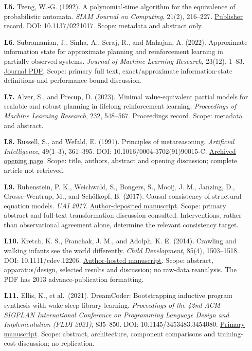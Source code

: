 \documentclass[
  11pt,
  a4paper,
]{article}
\begin{document}
\textbf{L5.} Tzeng, W.-G. (1992). A polynomial-time algorithm for the
equivalence of probabilistic automata. \emph{SIAM Journal on Computing},
21(2), 216--227.
\href{https://epubs.siam.org/doi/10.1137/0221017}{Publisher record}.
DOI: 10.1137/0221017. Scope: metadata and abstract only.

\textbf{L6.} Subramanian, J., Sinha, A., Seraj, R., and Mahajan, A.
(2022). Approximate information state for approximate planning and
reinforcement learning in partially observed systems. \emph{Journal of
Machine Learning Research}, 23(12), 1--83.
\href{https://www.jmlr.org/papers/volume23/20-1165/20-1165.pdf}{Journal
PDF}. Scope: primary full text, exact/approximate information-state
definitions and performance-bound discussion.

\textbf{L7.} Alver, S., and Precup, D. (2023). Minimal value-equivalent
partial models for scalable and robust planning in lifelong
reinforcement learning. \emph{Proceedings of Machine Learning Research},
232, 548--567.
\href{https://proceedings.mlr.press/v232/alver23a.html}{Proceedings
record}. Scope: metadata and abstract.

\textbf{L8.} Russell, S., and Wefald, E. (1991). Principles of
metareasoning. \emph{Artificial Intelligence}, 49(1--3), 361--395. DOI:
10.1016/0004-3702(91)90015-C.
\href{https://iiif.library.cmu.edu/file/Newell_box00014_fld01011_doc0001/Newell_box00014_fld01011_doc0001.pdf}{Archived
opening page}. Scope: title, authors, abstract and opening discussion;
complete article not retrieved.

\textbf{L9.} Rubenstein, P. K., Weichwald, S., Bongers, S., Mooij, J.
M., Janzing, D., Grosse-Wentrup, M., and Schölkopf, B. (2017). Causal
consistency of structural equation models. \emph{UAI 2017}.
\href{https://arxiv.org/abs/1707.00819}{Author-deposited manuscript}.
Scope: primary abstract and full-text transformation discussion
consulted. Interventions, rather than observational agreement alone,
determine the relevant consistency target.

\textbf{L10.} Kretch, K. S., Franchak, J. M., and Adolph, K. E. (2014).
Crawling and walking infants see the world differently. \emph{Child
Development}, 85(4), 1503--1518. DOI: 10.1111/cdev.12206.
\href{https://johnfranchak.github.io/padlab/publications/2014-KretchFranchakAdolph-ChiDev.pdf}{Author-hosted
manuscript}. Scope: abstract, apparatus/design, selected results and
discussion; no raw-data reanalysis. The PDF has 2013 advance-publication
formatting.

\textbf{L11.} Ellis, K., et al.~(2021). DreamCoder: Bootstrapping
inductive program synthesis with wake-sleep library learning.
\emph{Proceedings of the 42nd ACM SIGPLAN International Conference on
Programming Language Design and Implementation (PLDI 2021)}, 835--850.
DOI: 10.1145/3453483.3454080.
\href{https://www.neurosymbolic.org/papers/EllisWNSMHCST21.pdf}{Primary
manuscript}. Scope: abstract, architecture, component comparisons and
training-cost discussion; no replication.
\end{document}

